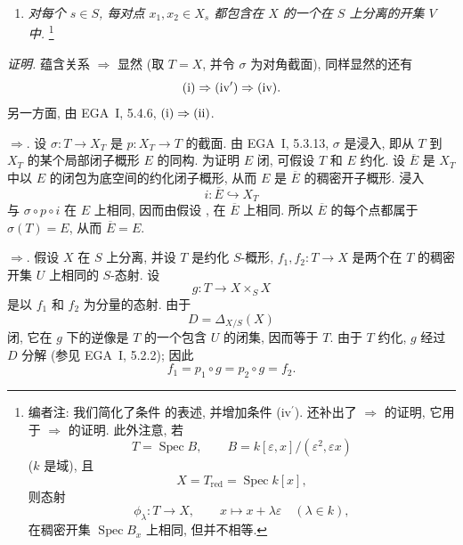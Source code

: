 \begin{enumerate}
\item[\textup{(iv\(^{\prime}\))}]
  \label{cond:sga3-VIB-5.6.3-iv-prime}
  \emph{对每个 \(s\in S\), 每对点 \(x_1,x_2\in X_s\)
  都包含在 \(X\) 的一个在 \(S\) 上分离的开集 \(V\) 中.}%
  \footnote{\label{note:sga3-VIB-44}编者注: 我们简化了条件
  \textup{} 的表述,
  并增加条件 \textup{(iv\(^{\prime}\))}.
  还补出了 \textup{}\(\Rightarrow\)\textup{}
  的证明, 它用于
  \textup{}\(\Rightarrow\)\textup{}
  的证明. 此外注意, 若
  \[
    T=\operatorname{Spec}B,\qquad
    B=k[\varepsilon,x]/(\varepsilon^2,\varepsilon x)
  \]
  \textup{(\(k\) 是域)}, 且
  \[
    X=T_{\mathrm{red}}=\operatorname{Spec}k[x],
  \]
  则态射
  \[
    \phi_\lambda:T\longrightarrow X,\qquad
    x\longmapsto x+\lambda\varepsilon
    \quad(\lambda\in k),
  \]
  在稠密开集 \(\operatorname{Spec}B_x\) 上相同, 但并不相等.}
\end{enumerate}

\emph{证明.}
蕴含关系 \textup{}\(\Rightarrow\)\textup{}
显然 (取 \(T=X\), 并令 \(\sigma\) 为对角截面), 同样显然的还有
\[
  \textup{(i)}\Rightarrow\textup{(iv\(^{\prime}\))}
  \Rightarrow\textup{(iv)}.
\]
另一方面, 由 EGA~I, 5.4.6,
\(\textup{(i)}\Rightarrow\textup{(ii)}\).

\smallskip
\noindent\textup{}\(\Rightarrow\)\textup{}.
设 \(\sigma:T\to X_T\) 是 \(p:X_T\to T\) 的截面.
由 EGA~I, 5.3.13, \(\sigma\) 是浸入,
即从 \(T\) 到 \(X_T\) 的某个局部闭子概形 \(E\) 的同构.
为证明 \(E\) 闭, 可假设 \(T\) 和 \(E\) 约化.
设 \(\overline E\) 是 \(X_T\) 中以 \(E\) 的闭包为底空间的约化闭子概形,
从而 \(E\) 是 \(\overline E\) 的稠密开子概形. 浸入
\[
  i:\overline E\hookrightarrow X_T
\]
与 \(\sigma\circ p\circ i\) 在 \(E\) 上相同,
因而由假设 \textup{},
在 \(\overline E\) 上相同. 所以 \(\overline E\) 的每个点都属于
\(\sigma(T)=E\), 从而 \(\overline E=E\).

\smallskip
\noindent\textup{}\(\Rightarrow\)\textup{}.
假设 \(X\) 在 \(S\) 上分离, 并设 \(T\) 是约化 \(S\)-概形,
\(f_1,f_2:T\to X\) 是两个在 \(T\) 的稠密开集 \(U\) 上相同的 \(S\)-态射.
设
\[
  g:T\longrightarrow X\times_S X
\]
是以 \(f_1\) 和 \(f_2\) 为分量的态射. 由于
\[
  D=\Delta_{X/S}(X)
\]
闭, 它在 \(g\) 下的逆像是 \(T\) 的一个包含 \(U\) 的闭集,
因而等于 \(T\). 由于 \(T\) 约化, \(g\) 经过 \(D\) 分解
(参见 EGA~I, 5.2.2); 因此
\[
  f_1=p_1\circ g=p_2\circ g=f_2.
\]

